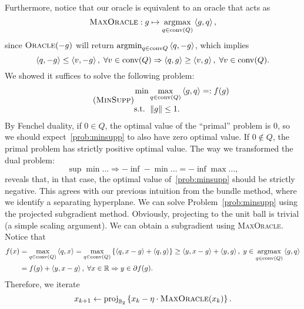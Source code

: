 \documentclass[10pt]{article}
\begin{document}
\begin{Answer}
    Furthermore, notice that our oracle is equivalent to an oracle that acts as
    \[
        \textsc{MaxOracle}: g \mapsto \operatorname*{argmax}_{q \in \mathrm{conv}(Q)} \left\langle g, q \right\rangle,
    \]
    since $\textsc{Oracle}(-g)$ will return $\operatorname*{argmin}_{q \in \mathrm{conv}{Q}}
    \left\langle q, -g \right\rangle$, which implies
    \[
        \left\langle q, -g \right\rangle \leq \left\langle v, -g \right\rangle, \; \forall v \in \mathrm{conv}(Q)
        \Rightarrow \left\langle q, g \right\rangle \geq \left\langle v, g \right\rangle, \; \forall v \in \mathrm{conv}(Q).
    \]
    We showed it suffices to solve the following problem:
    \begin{align}
        \tag{\textsc{MinSupp}}
        \begin{aligned}
            \min & \max_{q \in \convhull(Q)} \ip{g, q} =: f(g) \\
            \mbox{s.t. } & \norm{g} \leq 1.
        \end{aligned}
        \label{prob:minsupp}
    \end{align}
    By Fenchel duality, if $0 \in Q$, the optimal value of the ``primal''
    problem is $0$, so we should expect~\eqref{prob:minsupp} to also have
    zero optimal value. If $0 \notin Q$, the primal problem has strictly
    positive optimal value. The way we transformed the dual problem:
    \[
        \sup \min \dots \Rightarrow - \inf -\min \dots =  -
        \inf \max \dots,
    \]
    reveals that, in that case, the optimal value of~\eqref{prob:minsupp}
    should be strictly negative. This agrees with our previous intuition
    from the bundle method, where we identify a separating hyperplane.
    We can solve Problem~\eqref{prob:minsupp} using the projected subgradient
    method. Obviously, projecting to the unit ball is trivial (a simple scaling
    argument). We can obtain a subgradient using \textsc{MaxOracle}. Notice that
    \begin{align*}
        f(x) &= \max_{q \in \mathrm{conv}(Q)} \left\langle q, x \right\rangle =
        \max_{q \in \mathrm{conv}(Q)} \left\{ \left\langle q, x - g \right\rangle + \left\langle q, g \right\rangle \right\} \geq
        \left\langle y, x - g \right\rangle + \left\langle y, g \right\rangle, \; y \in \operatorname*{argmax}_{q \in \mathrm{conv}(Q)}
        \left\langle g, q \right\rangle \\
        &= f(g) + \left\langle y, x - g \right\rangle, \; \forall x \in \mathbb{R} \Rightarrow
           y \in \partial f(g).
    \end{align*}
    Therefore, we iterate
    \[
        x_{k+1} \gets \mathrm{proj}_{\mathbb{B}_2} \left\{ 
            x_k - \eta \cdot \textsc{MaxOracle}(x_k)  \right\}.
    \]
\end{Answer}




\end{document}
